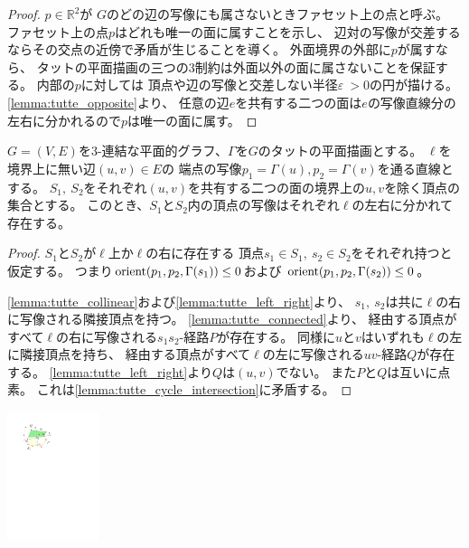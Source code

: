 
\begin{proof}%
$p\in \mathbb{R}^2$が
$G$のどの辺の写像にも属さないときファセット上の点と呼ぶ。
ファセット上の点$p$はどれも唯一の面に属すことを示し、
辺対の写像が交差するならその交点の近傍で矛盾が生じることを導く。
外面境界の外部に$p$が属すなら、
タットの平面描画の三つの3制約は外面以外の面に属さないことを保証する。
内部の$p$に対しては
頂点や辺の写像と交差しない半径$\varepsilon ~> 0$の円が描ける。
\cref{lemma:tutte_opposite}より、
任意の辺$e$を共有する二つの面は$e$の写像直線分の左右に分かれるので$p$は唯一の面に属す。
%
\end{proof}




\begin{lemma}
\label{lemma:tutte_opposite}
$G=(V, E)$を$3$-連結な平面的グラフ、$\Gamma$を$G$のタットの平面描画とする。
$\ell$を境界上に無い辺$(u, v) \in E$の
端点の写像$p_1=\Gamma(u), p_2=\Gamma(v)$を通る直線とする。
$S_1,~ S_2$をそれぞれ$(u, v)$を共有する二つの面の境界上の$u, v$を除く頂点の集合とする。
このとき、$S_1$と$S_2$内の頂点の写像はそれぞれ$\ell$の左右に分かれて存在する。
\end{lemma}

\begin{paracol}{2}
\begin{proof}
$S_1$と$S_2$が$\ell$上か$\ell$の右に存在する
頂点$s_1 \in S_1,~ s_2 \in S_2$をそれぞれ持つと仮定する。
つまり$\operatorname{orient}(p_1, p_2, \Gamma(s_1)) \leq 0$および
$\operatorname{orient}(p_1, p_2, \Gamma(s_2)) \leq 0$。


\cref{lemma:tutte_collinear}および\cref{lemma:tutte_left_right}より、
$s_1,~ s_2$は共に$\ell$の右に写像される隣接頂点を持つ。
\cref{lemma:tutte_connected}より、
経由する頂点がすべて$\ell$の右に写像される$s_1 s_2$-経路$P$が存在する。
同様に$u$と$v$はいずれも$\ell$の左に隣接頂点を持ち、
経由する頂点がすべて$\ell$の左に写像される$uv$-経路$Q$が存在する。
\cref{lemma:tutte_left_right}より$Q$は$(u, v)$でない。
また$P$と$Q$は互いに点素。
これは\cref{lemma:tutte_cycle_intersection}に矛盾する。
\end{proof}
\switchcolumn
\centering
\includegraphics[width=0.2\textwidth]{figures/tutte_opposite.pdf}
\end{paracol}





